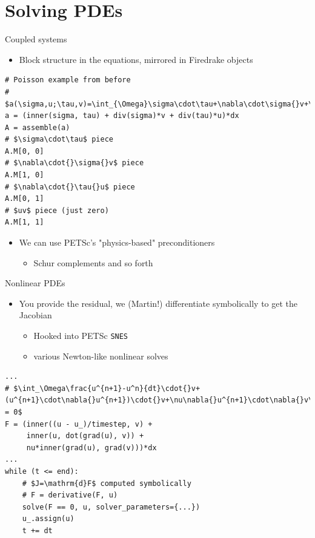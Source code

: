 \documentclass[bigger]{beamer}
\begin{document}
\section{Solving PDEs}
\label{sec:orgheadline25}

\begin{frame}[fragile,label={sec:orgheadline23}]{Coupled systems}
 \begin{itemize}
\item Block structure in the equations, mirrored in Firedrake objects
\end{itemize}
\begin{verbatim}
# Poisson example from before
# $a(\sigma,u;\tau,v)=\int_{\Omega}\sigma\cdot\tau+\nabla\cdot\sigma{}v+\nabla\cdot\tau{}u\mathrm{d}x$
a = (inner(sigma, tau) + div(sigma)*v + div(tau)*u)*dx
A = assemble(a)
# $\sigma\cdot\tau$ piece
A.M[0, 0]
# $\nabla\cdot{}\sigma{}v$ piece
A.M[1, 0]
# $\nabla\cdot{}\tau{}u$ piece
A.M[0, 1]
# $uv$ piece (just zero)
A.M[1, 1]
\end{verbatim}
\begin{itemize}
\item We can use PETSc's "physics-based" preconditioners
\begin{itemize}
\item Schur complements and so forth
\end{itemize}
\end{itemize}
\end{frame}

\begin{frame}[fragile,label={sec:orgheadline24}]{Nonlinear PDEs}
 \begin{itemize}
\item You provide the residual, we (Martin!) differentiate symbolically to get the
Jacobian
\begin{itemize}
\item Hooked into PETSc \texttt{SNES}
\item various Newton-like nonlinear solves
\end{itemize}
\end{itemize}

\begin{verbatim}
...
# $\int_\Omega\frac{u^{n+1}-u^n}{dt}\cdot{}v+(u^{n+1}\cdot\nabla{}u^{n+1})\cdot{}v+\nu\nabla{}u^{n+1}\cdot\nabla{}v\;\mathrm{d}x = 0$
F = (inner((u - u_)/timestep, v) +
     inner(u, dot(grad(u), v)) +
     nu*inner(grad(u), grad(v)))*dx
...
while (t <= end):
    # $J=\mathrm{d}F$ computed symbolically
    # F = derivative(F, u)
    solve(F == 0, u, solver_parameters={...})
    u_.assign(u)
    t += dt
\end{verbatim}
\end{frame}
\end{document}
